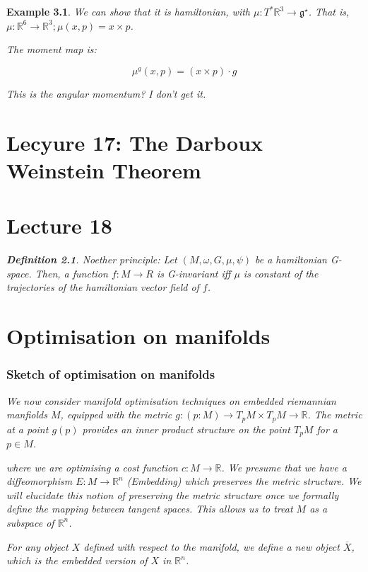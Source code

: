 \documentclass[11pt]{book}
\newcommand{\R}{\ensuremath{\mathbb R}}
\newcommand{\coT}{\ensuremath{T^*}}
\newtheorem{definition}[theorem]{Definition}
\newtheorem{example}[theorem]{Example}
\begin{document}
\begin{example}
We can show that it is hamiltonian, with $\mu: \coT \R^3 \rightarrow \mathfrak g^\star$.
That is, $\mu: \R^6 \rightarrow \R^3; \mu(x, p) = x \times p$.


The moment map is:

$$
\mu^g(x, p) = (x \times p) \cdot g
$$

This is the angular momentum? I don't get it.


\chapter{Lecyure 17: The Darboux Weinstein Theorem}

\chapter{Lecture 18}
\begin{definition}
Noether principle: Let $(M, \omega, G, \mu, \psi)$ be a hamiltonian G-space.
Then, a function $f: M \rightarrow R$ is G-invariant iff $\mu$ is constant
of the trajectories of the hamiltonian vector field of $f$.
\end{definition}

\chapter{Optimisation on manifolds}

\subsection{Sketch of optimisation on manifolds}
We now consider manifold optimisation techniques on embedded riemannian manfiolds $M$,
equipped with the metric $g: (p: M) \rightarrow T_p M  \times T_p M \rightarrow \mathbb R$.
The metric at a point $g(p)$ provides an inner product structure on the point $T_pM$
for a $p \in M$.

where we are optimising a cost function $c: M \rightarrow \mathbb R$.
We presume that we have a diffeomorphism $E: M \rightarrow \mathbb R^n$ (Embedding) which
preserves the metric structure. We will elucidate this notion of preserving
the metric structure once we formally define the mapping between tangent spaces.
This allows us to treat $M$ as a subspace of $\mathbb R^n$.

For any object $X$
defined with respect to the manifold, we define a new object $\overline X$, which
is the embedded version of $X$ in $\mathbb R^n$.


\end{example}
\end{document}
